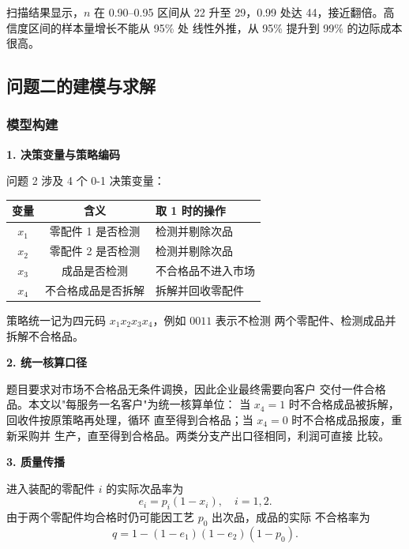 \documentclass[withoutpreface,bwprint]{cumcmthesis}
\begin{document}
扫描结果显示，$n$ 在 0.90--0.95 区间从 22 升至 29，0.99
处达 44，接近翻倍。高信度区间的样本量增长不能从 95\% 处
线性外推，从 95\% 提升到 99\% 的边际成本很高。

\subsection{问题二的建模与求解}
\label{sec:q2}

\subsubsection{模型构建}

\textbf{1. 决策变量与策略编码}

问题 2 涉及 4 个 0-1 决策变量：

\begin{table}[htbp]
\centering
\small
\begin{tabular}{ccl}
\toprule[1.5pt]
\textbf{变量} & \textbf{含义} & \textbf{取 1 时的操作} \\
\midrule[1pt]
$x_1$ & 零配件 1 是否检测 & 检测并剔除次品 \\
$x_2$ & 零配件 2 是否检测 & 检测并剔除次品 \\
$x_3$ & 成品是否检测     & 不合格品不进入市场 \\
$x_4$ & 不合格成品是否拆解 & 拆解并回收零配件 \\
\bottomrule[1.5pt]
\end{tabular}
\end{table}

策略统一记为四元码 $x_1 x_2 x_3 x_4$，例如 $0011$ 表示不检测
两个零配件、检测成品并拆解不合格品。

\textbf{2. 统一核算口径}

题目要求对市场不合格品无条件调换，因此企业最终需要向客户
交付一件合格品。本文以"每服务一名客户"为统一核算单位：
当 $x_4 = 1$ 时不合格成品被拆解，回收件按原策略再处理，循环
直至得到合格品；当 $x_4 = 0$ 时不合格成品报废，重新采购并
生产，直至得到合格品。两类分支产出口径相同，利润可直接
比较。

\textbf{3. 质量传播}

进入装配的零配件 $i$ 的实际次品率为
\begin{equation}
    e_i = p_i (1 - x_i), \quad i = 1, 2.
\end{equation}
由于两个零配件均合格时仍可能因工艺 $p_0$ 出次品，成品的实际
不合格率为
\begin{equation}
    q = 1 - (1 - e_1)(1 - e_2)(1 - p_0).
    \label{eq:q2-q}
\end{equation}
\end{document}
